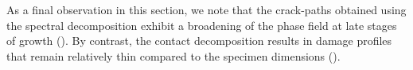 As a final observation in this section, we note that the crack-paths obtained using the spectral decomposition exhibit a broadening of the phase field at late stages of growth ().  By contrast, the contact decomposition results in damage profiles that remain relatively thin compared to the specimen dimensions ().
